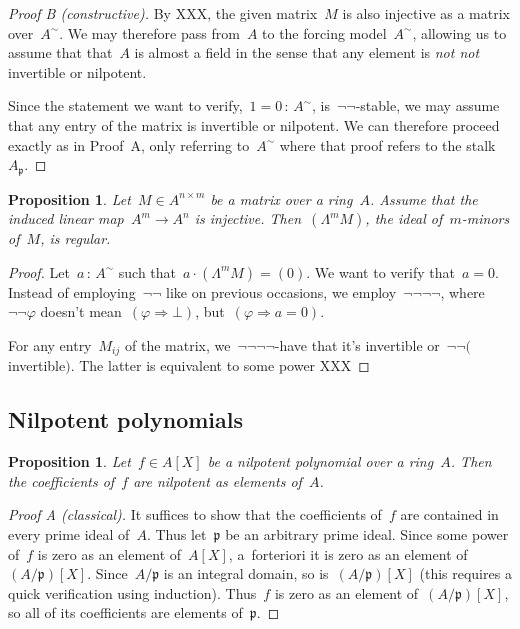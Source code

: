 \documentclass{amsart}
\theoremstyle{definition}
\theoremstyle{plain}
\newtheorem{prop}[defn]{Proposition}
\theoremstyle{remark}
\newcommand{\ppp}{\mathfrak{p}}
\newcommand{\?}{\,{:}\,}
\newcommand{\notnot}{\emph{not not}\xspace}
\newcommand{\negg}{\neg\!\!\!\neg}
\begin{document}
\begin{proof}[Proof B (constructive)]By XXX, the given matrix~$M$ is also
injective as a matrix over~$A^\sim$. We may therefore pass from~$A$ to the
forcing model~$A^\sim$, allowing us to assume that that~$A$ is almost a field
in the sense that any element is \notnot invertible or nilpotent.

Since the statement we want to verify,~$1 = 0 \? A^\sim$, is~$\neg\neg$-stable,
we may assume that any entry of the matrix is invertible or nilpotent. We can
therefore proceed exactly as in Proof~A, only referring to~$A^\sim$ where that
proof refers to the stalk~$A_\ppp$.
\end{proof}

\begin{prop}Let~$M \in A^{n \times m}$ be a matrix over a ring~$A$. Assume that
the induced linear map~$A^m \to A^n$ is injective. Then~$(\Lambda^m M)$, the
ideal of~$m$-minors of~$M$, is regular.
\end{prop}

\begin{proof}Let~$a \? A^\sim$ such that~$a \cdot (\Lambda^m M) = (0)$. We want
to verify that~$a = 0$. Instead of employing~$\neg\neg$ like on previous
occasions, we employ~$\negg\negg$, where~$\negg\varphi$ doesn't mean~$(\varphi
\Rightarrow \bot)$, but~$(\varphi \Rightarrow a = 0)$.

For any entry~$M_{ij}$ of the matrix, we~$\negg\negg$-have that it's invertible
or~$\negg($invertible$)$. The latter is equivalent to some power XXX
\end{proof}


\subsection{Nilpotent polynomials}

\begin{prop}Let~$f \in A[X]$ be a nilpotent polynomial over a ring~$A$. Then
the coefficients of~$f$ are nilpotent as elements of~$A$.
\end{prop}

\begin{proof}[Proof A (classical)]It suffices to show that the coefficients
of~$f$ are contained in every prime ideal of~$A$. Thus let~$\ppp$ be an
arbitrary prime ideal. Since some power of~$f$ is zero as an element of~$A[X]$,
a~forteriori it is zero as an element of~$(A/\ppp)[X]$. Since~$A/\ppp$ is an
integral domain, so is~$(A/\ppp)[X]$ (this requires a quick verification using
induction). Thus~$f$ is zero as an element of~$(A/\ppp)[X]$, so all of its
coefficients are elements of~$\ppp$.
\end{proof}
\end{document}
